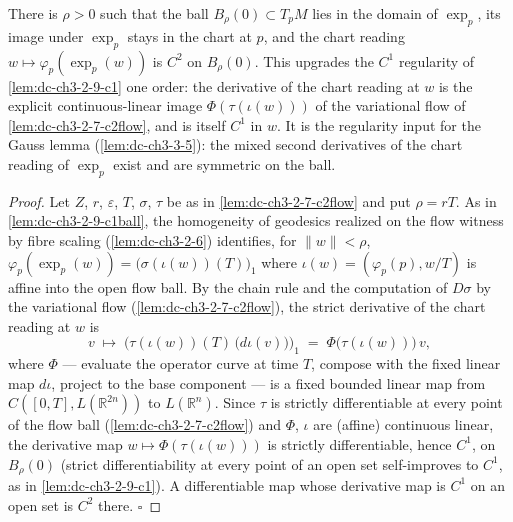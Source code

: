 \begin{lemma}
  \label{lem:dc-ch3-2-9-c2ball}
  \leanok
  There is $\rho > 0$ such that the ball $B_\rho(0) \subset T_pM$ lies in the
  domain of $\exp_p$, its image under $\exp_p$ stays in the chart at $p$, and
  the chart reading $w \mapsto \varphi_p(\exp_p(w))$ is $C^2$ on $B_\rho(0)$.
  This upgrades the $C^1$ regularity of \cref{lem:dc-ch3-2-9-c1} one order:
  the derivative of the chart reading at $w$ is the explicit
  continuous-linear image $\Phi(\tau(\iota(w)))$ of the variational flow of
  \cref{lem:dc-ch3-2-7-c2flow}, and is itself $C^1$ in $w$. It is the
  regularity input for the Gauss lemma (\cref{lem:dc-ch3-3-5}): the mixed
  second derivatives of the chart reading of $\exp_p$ exist and are symmetric
  on the ball.
\end{lemma}
\begin{proof}
  \leanok
  Let $Z$, $r$, $\varepsilon$, $T$, $\sigma$, $\tau$ be as in
  \cref{lem:dc-ch3-2-7-c2flow} and put $\rho = rT$. As in
  \cref{lem:dc-ch3-2-9-c1ball}, the homogeneity of geodesics realized on the
  flow witness by fibre scaling (\cref{lem:dc-ch3-2-6}) identifies, for
  $\|w\| < \rho$,
  $\varphi_p(\exp_p(w)) = \big(\sigma(\iota(w))(T)\big)_1$ where
  $\iota(w) = (\varphi_p(p), w/T)$ is affine into the open flow ball. By the
  chain rule and the computation of $D\sigma$ by the variational flow
  (\cref{lem:dc-ch3-2-7-c2flow}), the strict derivative of the chart reading
  at $w$ is
  $$
  v \;\longmapsto\; \Big(\tau(\iota(w))(T)\,\big(d\iota(v)\big)\Big)_1
  \;=\; \Phi\big(\tau(\iota(w))\big)\,v,
  $$
  where $\Phi$ — evaluate the operator curve at time $T$, compose with the
  fixed linear map $d\iota$, project to the base component — is a fixed
  bounded linear map from $C([0,T], L(\mathbb{R}^{2n}))$ to
  $L(\mathbb{R}^n)$. Since $\tau$ is strictly differentiable at every point
  of the flow ball (\cref{lem:dc-ch3-2-7-c2flow}) and $\Phi$, $\iota$ are
  (affine) continuous linear, the derivative map
  $w \mapsto \Phi(\tau(\iota(w)))$ is strictly differentiable, hence $C^1$,
  on $B_\rho(0)$ (strict differentiability at every point of an open set
  self-improves to $C^1$, as in \cref{lem:dc-ch3-2-9-c1}). A differentiable
  map whose derivative map is $C^1$ on an open set is $C^2$ there. $\square$
\end{proof}

